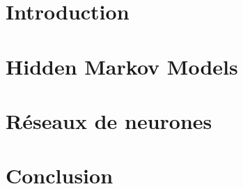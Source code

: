 \documentclass[a4paper]{article}
\begin{document}
	


	\tableofcontents
	\newpage
	

	\section*{Introduction}
	
	\newpage


	\section{Hidden Markov Models}
	
	\newpage
	
	\section{Réseaux de neurones}
	
	\newpage
	

	\section*{Conclusion}
	
	
\end{document}
